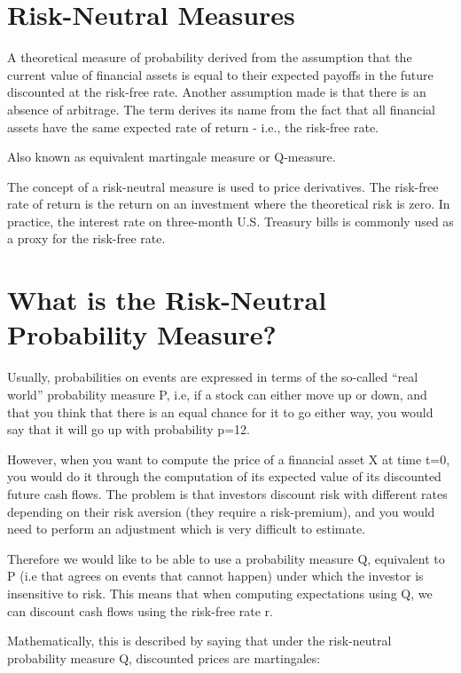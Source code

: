 \documentclass[]{article}
\begin{document}
\section{Risk-Neutral Measures}

A theoretical measure of probability derived from the assumption that the current value of financial assets is equal to their expected payoffs in the future discounted at the risk-free rate. Another assumption made is that there is an absence of arbitrage. The term derives its name from the fact that all financial assets have the same expected rate of return - i.e., the risk-free rate. 

Also known as equivalent martingale measure or Q-measure. 


The concept of a risk-neutral measure is used to price derivatives. The risk-free rate of return is the return on an investment where the theoretical risk is zero. In practice, the interest rate on three-month U.S. Treasury bills is commonly used as a proxy for the risk-free rate.
\section{What is the Risk-Neutral Probability Measure?}

Usually, probabilities on events are expressed in terms of the so-called “real world” probability measure P, i.e, if a stock can either move up or down, and that you think that there is an equal chance for it to go either way, you would say that it will go up with probability p=12.

However, when you want to compute the price of a financial asset X at time t=0, you would do it through the computation of its expected value of its discounted future cash flows. The problem is that investors discount risk with different rates depending on their risk aversion (they require a risk-premium), and you would need to perform an adjustment which is very difficult to estimate.

Therefore we would like to be able to use a probability measure Q, equivalent to P (i.e that agrees on events that cannot happen) under which the investor is insensitive to risk. This means that when computing expectations using Q,  we can discount cash flows using the risk-free rate r.

Mathematically, this is described by saying that under the risk-neutral probability measure Q, discounted prices are martingales:
\end{document}
